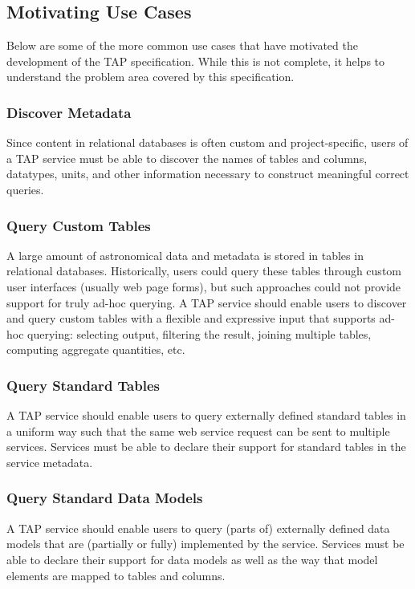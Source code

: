 \documentclass[11pt,letter]{ivoa}
\begin{document}
\subsection{Motivating Use Cases}
Below are some of the more common use cases that have motivated the development 
of the TAP specification. While this is not complete, it helps to understand the 
problem area covered by this specification.

\subsubsection{Discover Metadata}
Since content in relational databases is often custom and project-specific, 
users of a TAP service must be able to discover the names of tables and 
columns, datatypes, units, and other information necessary to construct 
meaningful correct queries.

\subsubsection{Query Custom Tables}
A large amount of astronomical data and metadata is stored in tables in 
relational databases. Historically, users could query these tables through 
custom user interfaces (usually web page forms), but such approaches could not 
provide support for truly ad-hoc querying. A TAP service should enable users to 
discover and query custom tables with a flexible and expressive input that 
supports ad-hoc querying: selecting output, filtering the result, joining 
multiple tables, computing aggregate quantities, etc. 

\subsubsection{Query Standard Tables}
A TAP service should enable users to query externally defined standard tables 
in a uniform way such that the same web service request can be sent to multiple 
services. Services must be able to declare their support for standard tables in 
the service metadata.

\subsubsection{Query Standard Data Models}
A TAP service should enable users to query (parts of) externally defined data 
models that are (partially or fully) implemented by the service. Services must 
be able to declare their support for data models as well as the way that model 
elements are mapped to tables and columns.
\end{document}
